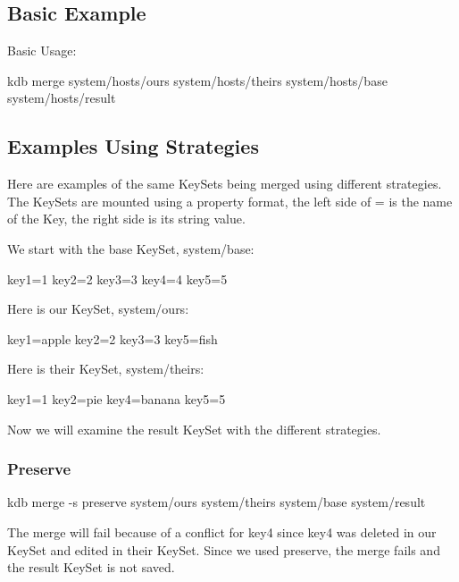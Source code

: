 \subsection*{Basic Example}

Basic Usage\+:


\begin{DoxyCode}
kdb merge system/hosts/ours system/hosts/theirs system/hosts/base system/hosts/result
\end{DoxyCode}


\subsection*{Examples Using Strategies}

Here are examples of the same Key\+Sets being merged using different strategies. The Key\+Sets are mounted using a property format, the left side of \textquotesingle{}=\textquotesingle{} is the name of the Key, the right side is its string value.

We start with the base Key\+Set, {\ttfamily system/base}\+:


\begin{DoxyCode}
key1=1
key2=2
key3=3
key4=4
key5=5
\end{DoxyCode}


Here is our Key\+Set, {\ttfamily system/ours}\+:


\begin{DoxyCode}
key1=apple
key2=2
key3=3
key5=fish
\end{DoxyCode}


Here is their Key\+Set, {\ttfamily system/theirs}\+:


\begin{DoxyCode}
key1=1
key2=pie
key4=banana
key5=5
\end{DoxyCode}


Now we will examine the result Key\+Set with the different strategies.

\subsubsection*{Preserve}


\begin{DoxyCode}
kdb merge -s preserve system/ours system/theirs system/base system/result
\end{DoxyCode}


The merge will fail because of a conflict for {\ttfamily key4} since {\ttfamily key4} was deleted in our Key\+Set and edited in their Key\+Set. Since we used preserve, the merge fails and the result Key\+Set is not saved.

